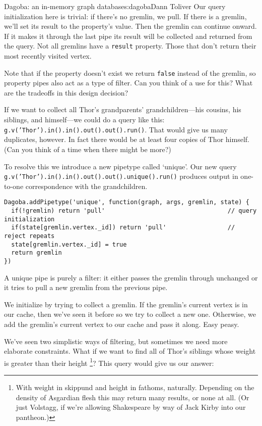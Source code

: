 \begin{aosachapter}{Dagoba: an in-memory graph database}{s:dagoba}{Dann Toliver}
Our query initialization here is trivial: if there's no gremlin, we
pull. If there is a gremlin, we'll set its result to the property's
value. Then the gremlin can continue onward. If it makes it through the
last pipe its result will be collected and returned from the query. Not
all gremlins have a \texttt{result} property. Those that don't return
their most recently visited vertex.

Note that if the property doesn't exist we return \texttt{false} instead
of the gremlin, so property pipes also act as a type of filter. Can you
think of a use for this? What are the tradeoffs in this design decision?

\label{unique}

If we want to collect all Thor's grandparents' grandchildren---his
cousins, his siblings, and himself---we could do a query like this:
\texttt{g.v('Thor').in().in().out().out().run()}. That would give us
many duplicates, however. In fact there would be at least four copies of
Thor himself. (Can you think of a time when there might be more?)

To resolve this we introduce a new pipetype called `unique'. Our new
query
\linebreak \texttt{g.v('Thor').in().in().out().out().unique().run()}
produces output in one-to-one correspondence with the grandchildren.

\begin{verbatim}
Dagoba.addPipetype('unique', function(graph, args, gremlin, state) {
  if(!gremlin) return 'pull'                                  // query initialization
  if(state[gremlin.vertex._id]) return 'pull'                 // reject repeats
  state[gremlin.vertex._id] = true
  return gremlin
})
\end{verbatim}

A unique pipe is purely a filter: it either passes the gremlin through
unchanged or it tries to pull a new gremlin from the previous pipe.

We initialize by trying to collect a gremlin. If the gremlin's current
vertex is in our cache, then we've seen it before so we try to collect a
new one. Otherwise, we add the gremlin's current vertex to our cache and
pass it along. Easy peasy.

\label{filter}

We've seen two simplistic ways of filtering, but sometimes we need more
elaborate constraints. What if we want to find all of Thor's siblings
whose weight is greater than their height \footnote{With weight in
  skippund and height in fathoms, naturally. Depending on the density of
  Asgardian flesh this may return many results, or none at all. (Or just
  Volstagg, if we're allowing Shakespeare by way of Jack Kirby into our
  pantheon.)}? This query would give us our answer:


\end{aosachapter}
